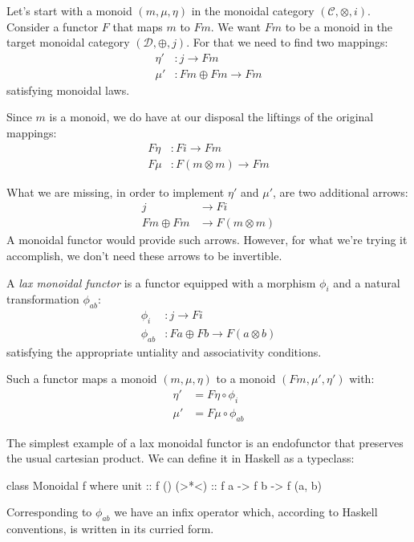 \documentclass[DaoFP]{subfiles}
\begin{document}
Let's start with a monoid $(m, \mu, \eta)$ in the monoidal category $(\mathcal{C}, \otimes, i)$. Consider a functor $F$ that maps $m$ to $F m$. We want $F m$ to be a monoid in the target monoidal category $(\mathcal{D}, \oplus, j)$. For that we need to find two mappings:
\begin{align*}
\eta' &\colon j \to F m \\
 \mu' &\colon F m \oplus F m \to F m 
\end{align*}
satisfying monoidal laws.

Since $m$ is a monoid, we do have at our disposal the liftings of the original mappings:
\begin{align*}
 F \eta &\colon F i \to F m \\
 F \mu &\colon F (m \otimes m) \to F m
\end{align*}

What we are missing, in order to implement $\eta'$ and $\mu'$, are two additional arrows:
\begin{align*}
j &\to F i\\
 F m \oplus F m &\to F (m \otimes m)
 \end{align*}
A monoidal functor would provide such arrows. However, for what we're trying it accomplish, we don't need these arrows to be invertible. 

A \emph{lax monoidal functor} is a functor equipped with a morphism $\phi_i$ and a natural transformation $\phi_{ab}$:
\begin{align*}
\phi_i &\colon j \to F i \\
\phi_{a b} &\colon F a \oplus F b \to F (a \otimes b)
\end{align*}
satisfying the appropriate untiality and associativity conditions.

Such a functor maps a monoid $(m, \mu, \eta)$ to a monoid $(F m, \mu', \eta')$ with:
\begin{align*}
\eta' &= F \eta \circ \phi_i \\
\mu' &= F \mu \circ \phi_{a b}
\end{align*}

The simplest example of a lax monoidal functor is an endofunctor that preserves the usual cartesian product. We can define it in Haskell as a typeclass:

\begin{haskell}
class Monoidal f where
  unit  :: f ()
  (>*<) :: f a -> f b -> f (a, b)
\end{haskell}
Corresponding to $\phi_{a b}$ we have an infix operator which, according to Haskell conventions, is written in its curried form.
\end{document}

